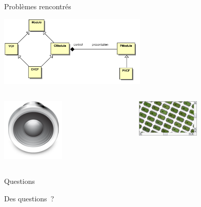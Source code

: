 \documentclass[frenchb]{beamer}
\begin{document}
\begin{frame}{Problèmes rencontrés}
    \begin{center}
        \includegraphics[width=7cm]{../img/ps/pacmodule-psm.pdf}
    \end{center}
    \pause
    \begin{columns}
        \begin{column}[l]{7cm}
        \includegraphics[width=3cm]{../img/png/arts128x128.png}
        \end{column}
        \pause
        \begin{column}[r]{4cm}
        \includegraphics[width=3cm]{../img/png/graphicsview-view.png}
        \end{column}
    \end{columns}
\end{frame}

\begin{frame}{Questions}
    \begin{center}
        \Huge Des questions~?
    \end{center}
\end{frame}
\end{document}
